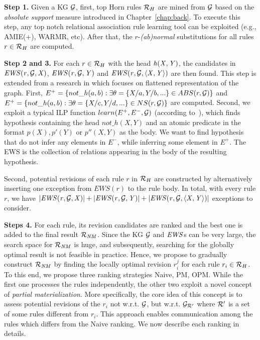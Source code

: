 \noindent \textbf{Step 1.} Given a KG $\mathcal{G}$, first, top Horn rules $\mathcal{R}_H$ are mined from $\mathcal{G}$ based on the \textit{absolute support} measure introduced in Chapter~\ref{chap:back}. To execute this step, any top notch relational association rule learning tool can be exploited (e.g., AMIE(+), WARMR, etc). After that, the $r$-\emph{(ab)normal} substitutions for all rules $r\in \mathcal{R}_H$ are computed.
\smallskip


\noindent \textbf{Step 2 and 3.} For each $r \in \mathcal{R}_H$ with the head $\mathit{h(X,Y)}$, the candidates in $\mathit{EWS(r,\mathcal{G},X)}$, $\mathit{EWS(r,\mathcal{G},Y)}$ and $\mathit{EWS(r,\mathcal{G},\langle X,Y\rangle)}$ are then found. This step is extended from a research in \cite{ref12} which focuses on flattened representation of the graph. First, $E^+ = \{not\_h(a, b): \exists \theta = \{X/a, Y/b, ... \} \in ABS(r, \mathcal{G})\}$ and $E^+ = \{not\_h(a, b): \exists \theta = \{X/c, Y/d, ... \} \in NS(r, \mathcal{G})\}$ are computed. Second, we exploit a typical ILP function $learn(E^+, E^-, \mathcal{G})$ (according to~\cite{ref55}), which finds hypothesis containing the head $not\_h(X, Y)$ and an atomic predicate in the format $p(X), p'(Y)$ or $p''(X, Y)$ as the body. We want to find hypothesis that do not infer any elements in $E^-$, while inferring some element in $E^+$. The EWS is the collection of relations appearing in the body of the resulting hypothesis.

Second, potential revisions of each rule $r$ in $\mathcal{R}_H$ are constructed by alternatively inserting one exception from $EWS(r)$ to the rule body. In total, with every rule $r$, we have $|\mathit{EWS(r,\mathcal{G},X)}|+|\mathit{EWS(r,\mathcal{G},Y)}|+|\mathit{EWS(r,\mathcal{G},\langle X,Y\rangle)}|$ exceptions to consider.

\smallskip

\noindent \textbf{Steps 4.} For each rule, its revision candidates are ranked and the best one is added to the final result $\mathcal{R}_{\mathit{NM}}$. Since the KG $\mathcal{G}$ and $\mathit{EWS}$s can be very large, the search space for $\mathcal{R}_{\mathit{NM}}$ is huge, and subsequently, searching for the globally optimal result is not feasible in practice. Hence, we propose to gradually construct $\mathcal{R}_{\mathit{NM}}$ by finding the locally optimal revision $r_i^{j}$ for each rule $r_i \in \mathcal{R}_{H}$. To this end, we propose three ranking strategies Naive, PM, OPM. While the first one processes the rules independently, the other two exploit a novel concept of \emph{partial materialization}. More specifically, the core idea of this concept is to assess potential revisions of the $r_i$ not w.r.t. $\mathcal{G}$, but w.r.t. $\mathcal{G}_{\mathcal{R}'}$ where $\mathcal{R}'$ is a set of some rules different from $r_i$. This approach enables communication among the rules which differs from the Naive ranking. We now describe each ranking in details.

